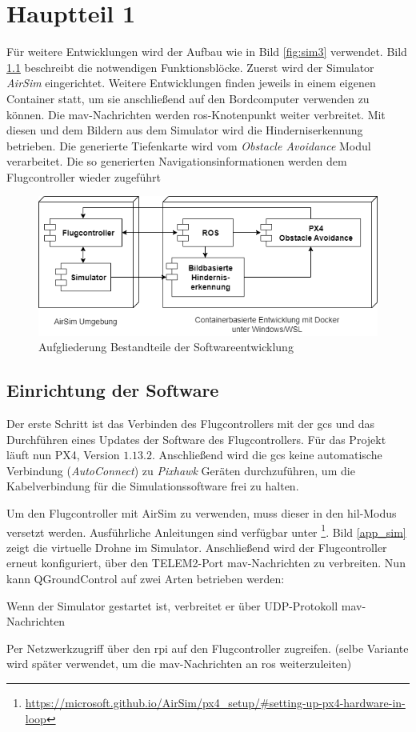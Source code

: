 
\chapter{Hauptteil 1}
Für weitere Entwicklungen wird der Aufbau wie in Bild \ref{fig:sim3} verwendet. Bild \ref{fig:vorgehe} beschreibt die notwendigen Funktionsblöcke. Zuerst wird der Simulator \textit{AirSim} eingerichtet. Weitere Entwicklungen finden jeweils in einem eigenen Container statt, um sie anschließend auf den Bordcomputer verwenden zu können. Die \gls{mav}-Nachrichten werden \acrshort{ros}-Knotenpunkt weiter verbreitet. Mit diesen und dem Bildern aus dem Simulator wird die Hinderniserkennung betrieben. Die generierte Tiefenkarte wird vom \textit{Obstacle Avoidance} Modul verarbeitet. Die so generierten Navigationsinformationen werden dem Flugcontroller wieder zugeführt

\begin{figure}[!h]
	\includegraphics[width=0.7\linewidth]{images/vorgehen_eigenteil.drawio.png}
	\caption{Aufgliederung Bestandteile der Softwareentwicklung}
	\label{fig:vorgehe}
	\end{figure}

\section{Einrichtung der Software}
Der erste Schritt ist das Verbinden des Flugcontrollers mit der \gls{gcs} und das Durchführen eines Updates der Software des Flugcontrollers. Für das Projekt läuft nun PX4, Version $1.13.2$. Anschließend wird die \gls{gcs} keine automatische Verbindung (\textit{AutoConnect}) zu \textit{Pixhawk} Geräten durchzuführen, um die Kabelverbindung für die Simulationssoftware frei zu halten.

Um den Flugcontroller mit AirSim zu verwenden, muss dieser in den \gls{hil}-Modus versetzt werden. Ausführliche Anleitungen sind verfügbar unter \footnote{\url{https://microsoft.github.io/AirSim/px4_setup/\#setting-up-px4-hardware-in-loop}\cite{microsoftcorporationWelcomeAirSim2023}}. Bild \ref{app_sim} zeigt die virtuelle Drohne im Simulator. Anschließend wird der Flugcontroller erneut konfiguriert, über den TELEM2-Port \gls{mav}-Nachrichten zu verbreiten. Nun kann QGroundControl auf zwei Arten betrieben werden:
\begin{compactitem}
    \item Wenn der Simulator gestartet ist, verbreitet er über UDP-Protokoll \gls{mav}-Nachrichten
    \item Per Netzwerkzugriff über den \gls{rpi} auf den Flugcontroller zugreifen. (selbe Variante wird später verwendet, um die \gls{mav}-Nachrichten an \acrshort{ros} weiterzuleiten)
\end{compactitem}

